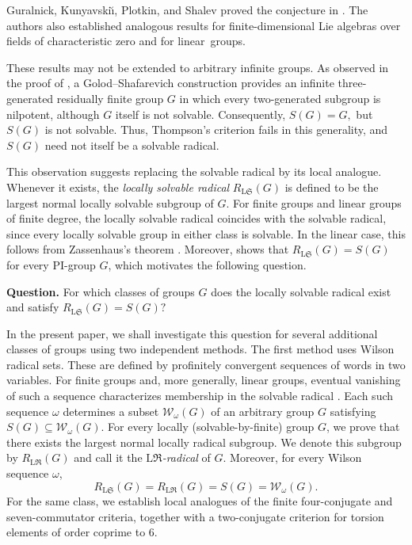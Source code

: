 \documentclass[11pt, reqno]{amsart}
\numberwithin{equation}{section}
\theoremstyle{definition}
\numberwithin{equation}{section}
\begin{document}
Guralnick, Kunyavski\u{\i}, Plotkin, and Shalev proved the conjecture in \cite[Theorem~1.1]{Guralnick06}. 
The authors also established analogous results for finite-dimensional Lie algebras over fields of characteristic zero and for linear~groups. 

These  results may not be extended to arbitrary infinite groups. 
As observed in the proof of \cite[Proposition~5.3]{Guralnick06}, a Golod--Shafarevich construction provides an infinite three-generated residually finite group $G$ in which every two-generated subgroup is nilpotent, although $G$ itself is not solvable. 
Consequently, $S(G)=G,$ but $S(G)$ is not solvable. 
Thus, Thompson's criterion fails in this generality, and $S(G)$ need not itself be a solvable radical.

This observation suggests replacing the solvable radical by its local analogue. 
Whenever it exists, the \emph{locally solvable radical} $R_{\mathrm{L}\mathfrak{S}}(G)$ is defined to be the largest normal locally solvable subgroup of $G$. 
For finite groups and linear groups of finite degree, the locally solvable radical coincides with the solvable radical, since every locally solvable group in either class is solvable. 
In the linear case, this follows from Zassenhaus's theorem \cite[Satz~8]{Zassenhaus1938}. 
Moreover, \cite[Theorem~4.4] {Guralnick06} shows that $R_{\mathrm{L}\mathfrak{S}}(G)=S(G)$ for every PI-group $G$, which motivates the following question.

\medskip

\noindent\textbf{Question.}
For which classes of groups $G$ does the locally solvable radical exist and satisfy
  $R_{\mathrm{L}\mathfrak{S}}(G)=S(G)?$

\medskip

In the present paper, we shall investigate this question for several additional classes of groups using two independent methods. 
The first method uses Wilson radical sets. These are defined by profinitely convergent  sequences of words in two variables. 
For finite groups and, more generally, linear groups, eventual vanishing of such a sequence characterizes membership in the solvable radical \cite[Theorem]{Wilson2011}. 
Each such sequence $\omega$ determines a subset $\mathcal{W}_{\omega}(G)$ of an arbitrary group $G$ satisfying $S(G)\subseteq \mathcal{W}_{\omega}(G).$
For every locally (solvable-by-finite) group $G$, we prove that there exists the largest normal locally radical subgroup. 
We denote this subgroup by $R_{\mathrm{L}\mathfrak{R}}(G)$ and call it the \emph{$\mathrm{L}\mathfrak{R}$-radical} of $G$. 
Moreover, for every Wilson sequence $\omega$,
  $$R_{\mathrm{L}\mathfrak{S}}(G) = R_{\mathrm{L}\mathfrak{R}}(G) = S(G) = \mathcal{W}_{\omega}(G).$$
For the same class, we establish local analogues of the finite four-conjugate and seven-commutator criteria, together with a two-conjugate criterion for torsion elements of order coprime to $6$.
\end{document}
